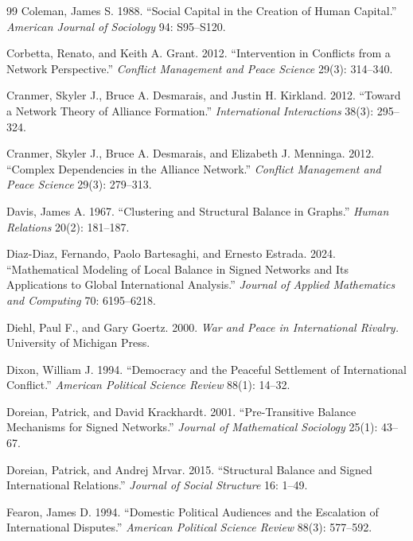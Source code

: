 \documentclass[Afour,sageh,times,doublespace]{sagej}
\begin{document}
\begin{thebibliography}{99}
 Coleman, James S. 1988. ``Social Capital in the Creation of Human Capital.'' \emph{American Journal of Sociology} 94: S95--S120.

 Corbetta, Renato, and Keith A. Grant. 2012. ``Intervention in Conflicts from a Network Perspective.'' \emph{Conflict Management and Peace Science} 29(3): 314--340.

 Cranmer, Skyler J., Bruce A. Desmarais, and Justin H. Kirkland. 2012. ``Toward a Network Theory of Alliance Formation.'' \emph{International Interactions} 38(3): 295--324.

 Cranmer, Skyler J., Bruce A. Desmarais, and Elizabeth J. Menninga. 2012. ``Complex Dependencies in the Alliance Network.'' \emph{Conflict Management and Peace Science} 29(3): 279--313.

 Davis, James A. 1967. ``Clustering and Structural Balance in Graphs.'' \emph{Human Relations} 20(2): 181--187.

 Diaz-Diaz, Fernando, Paolo Bartesaghi, and Ernesto Estrada. 2024. ``Mathematical Modeling of Local Balance in Signed Networks and Its Applications to Global International Analysis.'' \emph{Journal of Applied Mathematics and Computing} 70: 6195--6218.

 Diehl, Paul F., and Gary Goertz. 2000. \emph{War and Peace in International Rivalry.} University of Michigan Press.

 Dixon, William J. 1994. ``Democracy and the Peaceful Settlement of International Conflict.'' \emph{American Political Science Review} 88(1): 14--32.

 Doreian, Patrick, and David Krackhardt. 2001. ``Pre-Transitive Balance Mechanisms for Signed Networks.'' \emph{Journal of Mathematical Sociology} 25(1): 43--67.

 Doreian, Patrick, and Andrej Mrvar. 2015. ``Structural Balance and Signed International Relations.'' \emph{Journal of Social Structure} 16: 1--49.

 Fearon, James D. 1994. ``Domestic Political Audiences and the Escalation of International Disputes.'' \emph{American Political Science Review} 88(3): 577--592.


\end{thebibliography}
\end{document}
